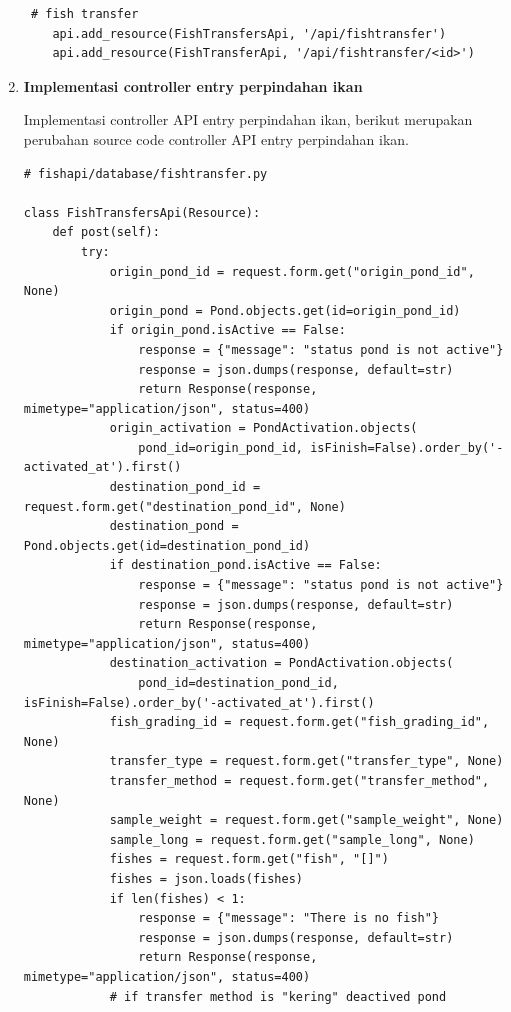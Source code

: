 \begin{enumerate}[1.]
\begin{lstlisting}
 # fish transfer
    api.add_resource(FishTransfersApi, '/api/fishtransfer')
    api.add_resource(FishTransferApi, '/api/fishtransfer/<id>')
\end{lstlisting}




\item \textbf{Implementasi controller entry perpindahan ikan}

Implementasi controller API entry perpindahan ikan, berikut merupakan perubahan source code controller API entry perpindahan ikan.

\begin{lstlisting}
# fishapi/database/fishtransfer.py

class FishTransfersApi(Resource):
    def post(self):
        try:
            origin_pond_id = request.form.get("origin_pond_id", None)
            origin_pond = Pond.objects.get(id=origin_pond_id)
            if origin_pond.isActive == False:
                response = {"message": "status pond is not active"}
                response = json.dumps(response, default=str)
                return Response(response, mimetype="application/json", status=400)
            origin_activation = PondActivation.objects(
                pond_id=origin_pond_id, isFinish=False).order_by('-activated_at').first()
            destination_pond_id = request.form.get("destination_pond_id", None)
            destination_pond = Pond.objects.get(id=destination_pond_id)
            if destination_pond.isActive == False:
                response = {"message": "status pond is not active"}
                response = json.dumps(response, default=str)
                return Response(response, mimetype="application/json", status=400)
            destination_activation = PondActivation.objects(
                pond_id=destination_pond_id, isFinish=False).order_by('-activated_at').first()
            fish_grading_id = request.form.get("fish_grading_id", None)
            transfer_type = request.form.get("transfer_type", None)
            transfer_method = request.form.get("transfer_method", None)
            sample_weight = request.form.get("sample_weight", None)
            sample_long = request.form.get("sample_long", None)
            fishes = request.form.get("fish", "[]")
            fishes = json.loads(fishes)
            if len(fishes) < 1:
                response = {"message": "There is no fish"}
                response = json.dumps(response, default=str)
                return Response(response, mimetype="application/json", status=400)
            # if transfer method is "kering" deactived pond

\end{lstlisting}
\end{enumerate}
